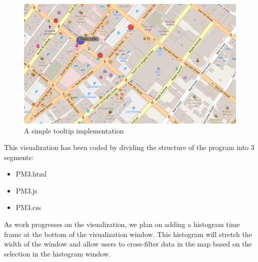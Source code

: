 \begin{figure}[h]
	\centering %
	\includegraphics[scale=0.36]{figs/tooltip.png}
	\caption{\footnotesize{A simple tooltip implementation}}
	\label{fig:First viz Chart}
	\captionsetup{justification=centering,margin=1cm}
	\vspace{-10pt}
\end{figure}
This visualization has been coded by dividing the structure of the program into 3 segments:
\begin{itemize}
    \item PM3.html
    \item PM3.js
    \item PM3.css
\end{itemize}
As work progresses on the visualization, we plan on adding a histogram time frame at the bottom of the visualization window. This histogram will stretch the width of the window and allow users to cross-filter data in the map based on the selection in the histogram window.